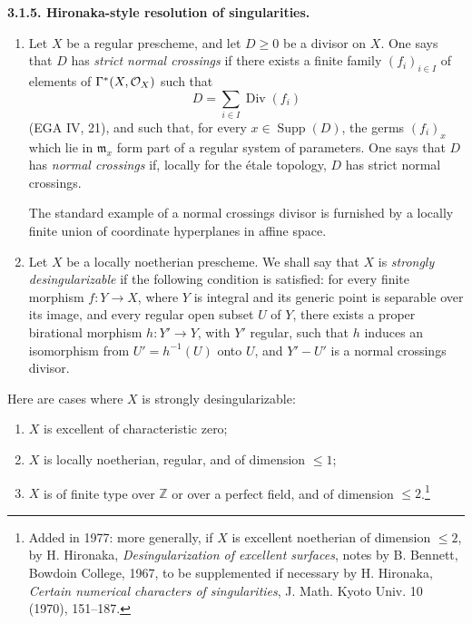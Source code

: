 \documentclass[11pt]{article}
\theoremstyle{plain}
\theoremstyle{definition}
\theoremstyle{remark}
\newenvironment{statement}[1]{\par\medskip\noindent\textbf{#1.}\ }{\par\medskip}
\newcommand{\ZZ}{\mathbb Z}
\DeclareMathOperator{\Div}{Div}
\DeclareMathOperator{\Supp}{Supp}
\newcommand{\fm}{\mathfrak m}
\begin{document}
\begin{statement}{3.1.5. Hironaka-style resolution of singularities}
\begin{enumerate}[label=\alph*)]
\item Let $X$ be a regular prescheme, and let $D\ge0$ be a divisor on $X$. One says that $D$ has \emph{strict normal crossings} if there exists a finite family $(f_i)_{i\in I}$ of elements of $\Gamma^*(X,\mathcal O_X)$ such that
\[
   D=\sum_{i\in I}\Div(f_i)
\]
(EGA IV, 21), and such that, for every $x\in\Supp(D)$, the germs $(f_i)_x$ which lie in $\fm_x$ form part of a regular system of parameters. One says that $D$ has \emph{normal crossings} if, locally for the étale topology, $D$ has strict normal crossings.

The standard example of a normal crossings divisor is furnished by a locally finite union of coordinate hyperplanes in affine space.

\item Let $X$ be a locally noetherian prescheme. We shall say that $X$ is \emph{strongly desingularizable} if the following condition is satisfied: for every finite morphism $f:Y\to X$, where $Y$ is integral and its generic point is separable over its image, and every regular open subset $U$ of $Y$, there exists a proper birational morphism $h:Y'\to Y$, with $Y'$ regular, such that $h$ induces an isomorphism from $U'=h^{-1}(U)$ onto $U$, and $Y'-U'$ is a normal crossings divisor.
\end{enumerate}
Here are cases where $X$ is strongly desingularizable:
\begin{enumerate}[label=\alph*)]
\item $X$ is excellent of characteristic zero;
\item $X$ is locally noetherian, regular, and of dimension $\le1$;
\item $X$ is of finite type over $\ZZ$ or over a perfect field, and of dimension $\le2$.\footnote{Added in 1977: more generally, if $X$ is excellent noetherian of dimension $\le2$, by H. Hironaka, \emph{Desingularization of excellent surfaces}, notes by B. Bennett, Bowdoin College, 1967, to be supplemented if necessary by H. Hironaka, \emph{Certain numerical characters of singularities}, J. Math. Kyoto Univ. 10 (1970), 151--187.}
\end{enumerate}
\end{statement}
\end{document}
